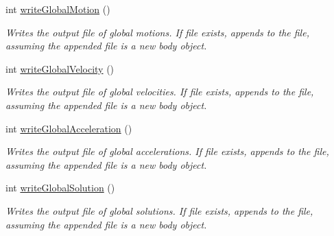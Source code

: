 \begin{DoxyCompactItemize}
\item 
int \hyperlink{classosea_1_1ofreq_1_1_file_writer_ada34dffe391a0daeac192bd4b7ed0ce5}{write\-Global\-Motion} ()
\begin{DoxyCompactList}\small\item\em Writes the output file of global motions. If file exists, appends to the file, assuming the appended file is a new body object. \end{DoxyCompactList}\item 
int \hyperlink{classosea_1_1ofreq_1_1_file_writer_a9887a28316fca1417da81c95b04c2208}{write\-Global\-Velocity} ()
\begin{DoxyCompactList}\small\item\em Writes the output file of global velocities. If file exists, appends to the file, assuming the appended file is a new body object. \end{DoxyCompactList}\item 
int \hyperlink{classosea_1_1ofreq_1_1_file_writer_a1c49975afb40d028c42027e5239bcdaa}{write\-Global\-Acceleration} ()
\begin{DoxyCompactList}\small\item\em Writes the output file of global accelerations. If file exists, appends to the file, assuming the appended file is a new body object. \end{DoxyCompactList}\item 
int \hyperlink{classosea_1_1ofreq_1_1_file_writer_ae5977c7303f36b1ae0b71bf9251c8a59}{write\-Global\-Solution} ()
\begin{DoxyCompactList}\small\item\em Writes the output file of global solutions. If file exists, appends to the file, assuming the appended file is a new body object. \end{DoxyCompactList}\end{DoxyCompactItemize}

